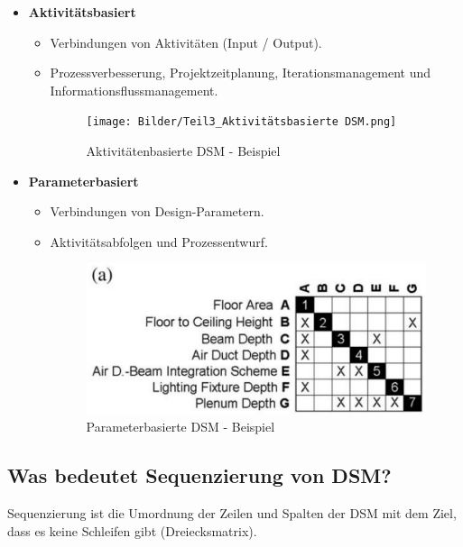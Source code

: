 \begin{itemize}
    \item \textbf{Aktivitätsbasiert}
        \begin{itemize}
            \item Verbindungen von Aktivitäten (Input / Output).
            \item Prozessverbesserung, Projektzeitplanung, Iterationsmanagement und Informationsflussmanagement.
            \begin{figure}[H]
                \centering
                \texttt{[image: Bilder/Teil3\_Aktivitätsbasierte DSM.png]}
                \caption{Aktivitätenbasierte DSM - Beispiel}
            \end{figure}
        \end{itemize}
    \item \textbf{Parameterbasiert}
        \begin{itemize}
            \item Verbindungen von Design-Parametern.
            \item Aktivitätsabfolgen und Prozessentwurf.
            \begin{figure}[H]
                \centering
                \includegraphics[width=0.6\linewidth]{Bilder/Teil3_ParameterbasierteDSM.png}
                \caption{Parameterbasierte DSM - Beispiel}
            \end{figure}
        \end{itemize}
\end{itemize}


\subsection{Was bedeutet Sequenzierung von DSM?}

Sequenzierung ist die Umordnung der Zeilen und Spalten der DSM mit dem Ziel, dass es keine Schleifen gibt (Dreiecksmatrix).

